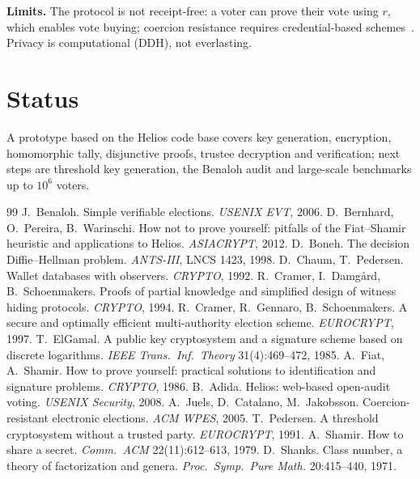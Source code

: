 \documentclass[10pt,twocolumn]{article}
\begin{document}
\textbf{Limits.} The protocol is not receipt-free: a voter can prove their vote using $r$, which enables vote buying; coercion resistance requires credential-based schemes~\cite{jcj2005}. Privacy is computational (DDH), not everlasting.

\section{Status}
A prototype based on the Helios code base covers key generation, encryption, homomorphic tally, disjunctive proofs, trustee decryption and verification; next steps are threshold key generation, the Benaloh audit and large-scale benchmarks up to $10^6$ voters.

\footnotesize
\begin{thebibliography}{99}\setlength{\itemsep}{0pt}
 J.~Benaloh. Simple verifiable elections. \emph{USENIX EVT}, 2006.
 D.~Bernhard, O.~Pereira, B.~Warinschi. How not to prove yourself: pitfalls of the Fiat--Shamir heuristic and applications to Helios. \emph{ASIACRYPT}, 2012.
 D.~Boneh. The decision Diffie--Hellman problem. \emph{ANTS-III}, LNCS 1423, 1998.
 D.~Chaum, T.~Pedersen. Wallet databases with observers. \emph{CRYPTO}, 1992.
 R.~Cramer, I.~Damg{\aa}rd, B.~Schoenmakers. Proofs of partial knowledge and simplified design of witness hiding protocols. \emph{CRYPTO}, 1994.
 R.~Cramer, R.~Gennaro, B.~Schoenmakers. A secure and optimally efficient multi-authority election scheme. \emph{EUROCRYPT}, 1997.
 T.~ElGamal. A public key cryptosystem and a signature scheme based on discrete logarithms. \emph{IEEE Trans.\ Inf.\ Theory} 31(4):469--472, 1985.
 A.~Fiat, A.~Shamir. How to prove yourself: practical solutions to identification and signature problems. \emph{CRYPTO}, 1986.
 B.~Adida. Helios: web-based open-audit voting. \emph{USENIX Security}, 2008.
 A.~Juels, D.~Catalano, M.~Jakobsson. Coercion-resistant electronic elections. \emph{ACM WPES}, 2005.
 T.~Pedersen. A threshold cryptosystem without a trusted party. \emph{EUROCRYPT}, 1991.
 A.~Shamir. How to share a secret. \emph{Comm.\ ACM} 22(11):612--613, 1979.
 D.~Shanks. Class number, a theory of factorization and genera. \emph{Proc.\ Symp.\ Pure Math.} 20:415--440, 1971.
\end{thebibliography}
\end{document}
